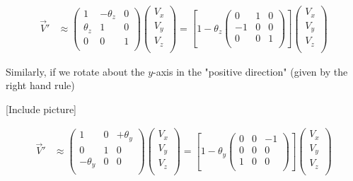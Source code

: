 \documentclass[11pt]{article}
\begin{document}
\begin{align*}
  \vec{V}' &\approx \begin{pmatrix}
    1 & -\theta_z & 0 \\
    \theta_z & 1 & 0 \\
    0 & 0 & 1 \\
  \end{pmatrix} 
  \begin{pmatrix}
      V_x \\
      V_y \\
      V_z \\
  \end{pmatrix} = \left[ 1 - \theta_z \begin{pmatrix}
    0 & 1 & 0 \\
    -1 & 0 & 0 \\
    0 & 0 & 1 \\
  \end{pmatrix}  \right]   \begin{pmatrix}
    V_x \\
    V_y \\
    V_z \\
\end{pmatrix}
\end{align*}


Similarly, if we rotate about the $y$-axis in the "positive direction" (given by the right hand rule)


\vskip 0.5cm
[Include picture]
\vskip 0.5cm

\begin{align*}
  \vec{V}' &\approx \begin{pmatrix}
    1 & 0 & +\theta_y \\
    0 & 1 & 0 \\
    -\theta_y & 0 & 0 \\
  \end{pmatrix} 
  \begin{pmatrix}
      V_x \\
      V_y \\
      V_z \\
  \end{pmatrix} = \left[ 1 - \theta_y \begin{pmatrix}
    0 & 0 & -1 \\
    0 & 0 & 0 \\
    1 & 0 & 0 \\
  \end{pmatrix}  \right]   \begin{pmatrix}
    V_x \\
    V_y \\
    V_z \\
\end{pmatrix}
\end{align*}
\end{document}
